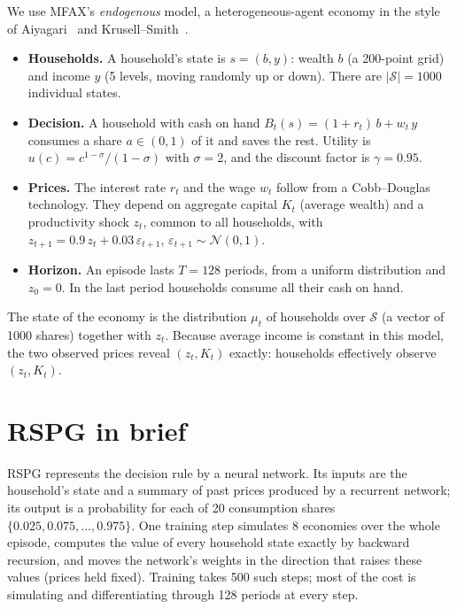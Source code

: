\documentclass[11pt,a4paper]{article}
\begin{document}
We use MFAX's \emph{endogenous} model, a heterogeneous-agent economy in the style of
Aiyagari~\cite{aiyagari} and Krusell--Smith~\cite{ks}.
\begin{itemize}
\item \textbf{Households.} A household's state is $s = (b, y)$: wealth $b$ (a 200-point grid) and
  income $y$ (5 levels, moving randomly up or down). There are $|\mathcal S| = 1000$ individual states.
\item \textbf{Decision.} A household with cash on hand $B_t(s) = (1+r_t)\,b + w_t\,y$ consumes a
  share $a \in (0,1)$ of it and saves the rest. Utility is $u(c) = c^{1-\sigma}/(1-\sigma)$ with
  $\sigma = 2$, and the discount factor is $\gamma = 0.95$.
\item \textbf{Prices.} The interest rate $r_t$ and the wage $w_t$ follow from a Cobb--Douglas
  technology. They depend on aggregate capital $K_t$ (average wealth) and a productivity shock $z_t$,
  common to all households, with $z_{t+1} = 0.9\,z_t + 0.03\,\varepsilon_{t+1}$,
  $\varepsilon_{t+1} \sim \mathcal N(0,1)$.
\item \textbf{Horizon.} An episode lasts $T = 128$ periods, from a uniform distribution and $z_0 = 0$.
  In the last period households consume all their cash on hand.
\end{itemize}
The state of the economy is the distribution $\mu_t$ of households over $\mathcal S$ (a vector of
1000 shares) together with $z_t$. Because average income is constant in this model, the two observed
prices reveal $(z_t, K_t)$ exactly: households effectively observe $(z_t, K_t)$.

\section{RSPG in brief}

RSPG represents the decision rule by a neural network. Its inputs are the household's state and a
summary of past prices produced by a recurrent network; its output is a probability for each of 20
consumption shares $\{0.025, 0.075, \ldots, 0.975\}$. One training step simulates 8 economies over
the whole episode, computes the value of every household state exactly by backward recursion, and
moves the network's weights in the direction that raises these values (prices held fixed). Training
takes 500 such steps; most of the cost is simulating and differentiating through 128 periods at
every step.
\end{document}

